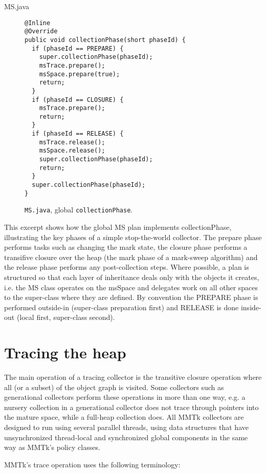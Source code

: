 MS.java
\begin{figure}[h]
\begin{lstlisting}
@Inline
@Override
public void collectionPhase(short phaseId) {
  if (phaseId == PREPARE) {
    super.collectionPhase(phaseId);
    msTrace.prepare();
    msSpace.prepare(true);
    return;
  }
  if (phaseId == CLOSURE) {
    msTrace.prepare();
    return;
  }
  if (phaseId == RELEASE) {
    msTrace.release();
    msSpace.release();
    super.collectionPhase(phaseId);
    return;
  }
  super.collectionPhase(phaseId);
}
\end{lstlisting}
\caption{\lstinline|MS.java|, global \lstinline|collectionPhase|.}
\label{fig:gc:ms-collectionphase}
\end{figure}
This excerpt shows how the global MS plan implements collectionPhase, 
illustrating the key phases of a simple stop-the-world collector.  
The prepare phase performs tasks such as changing the mark state, 
the closure phase performs a transifive closure over the heap 
(the mark phase of a mark-sweep algorithm) and the release phase 
performs any post-collection steps.  Where possible, a plan is 
structured so that each layer of inheritance deals only with the 
objects it creates, i.e. the MS class operates on the msSpace and 
delegates work on all other spaces to the super-class where they are defined.  
By convention the PREPARE phase is performed outside-in (super-class preparation first) 
and RELEASE is done inside-out (local first, super-class second).

\section{Tracing the heap}

The main operation of a tracing collector is the transitive closure operation where all (or a subset) of the object graph is visited.  Some collectors such as generational collectors perform these operations in more than one way, e.g. a nursery collection in a generational collector does not trace through pointers into the mature space, while a full-heap collection does.  All MMTk collectors are designed to run using several parallel threads, using data structures that have unsynchronized thread-local and synchronized global components in the same way as MMTk's policy classes.

MMTk's trace operation uses the following terminology:

